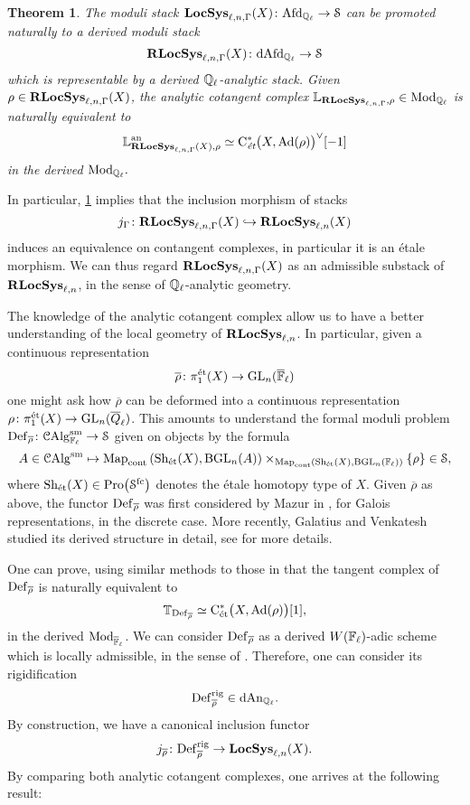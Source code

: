 \documentclass[10pt,a4paper]{amsart}
\numberwithin{equation}{subsection}
\theoremstyle{plain}
\newtheorem{theorem}{Theorem}[section]
\theoremstyle{definition}
\theoremstyle{remark}
\numberwithin{equation}{section}
\begin{document}
\begin{theorem} \label{intro:main}
The moduli stack $\mathbf{LocSys}_{\ell, n, \Gamma}(X) \colon \mathrm{Afd}_{\mathbb{Q}_\ell} \to \mathcal S$ can be promoted naturally to a derived moduli stack 
    \[
        \mathbf R \mathbf{LocSys}_{\ell, n, \Gamma}(X) \colon \mathrm{dAfd}_{\mathbb{Q}_\ell} \to \mathcal S
    \]
which is representable by a derived
$\mathbb{Q}_\ell$-analytic stack. Given $\rho \in \mathbf R \mathbf{LocSys}_{\ell, n, \Gamma}(X)$, the analytic cotangent complex $\mathbb L_{\mathbf R \mathbf{LocSys}_{\ell, n, \Gamma}, \rho} \in \mathrm{Mod}_{\mathbb Q_\ell}$ is naturally equivalent to
    \[
        \mathbb L^{\mathrm{an}}_{\mathbf R \mathbf{LocSys}_{\ell, n, \Gamma} (X), \rho } \simeq \mathrm C^*_{\emph{\text{\'et}}} \big( X, \mathrm{Ad} ( \rho) \big)^\vee[-1]
    \]
in the derived \infcat $\mathrm{Mod}_{\mathbb Q_\ell}.$
\end{theorem}


In particular, \cref{intro:main} implies that the inclusion morphism of stacks
    \[
        j_\Gamma \colon \mathbf R \mathbf{LocSys}_{\ell, n, \Gamma}(X) \hookrightarrow \mathbf R \mathbf{LocSys}_{\ell, n}(X)
    \]
induces an equivalence on contangent complexes, in particular it is an \'etale morphism.
We can thus regard $\mathbf R \mathbf{LocSys}_{\ell, n, \Gamma}(X)$ as an admissible substack of $\mathbf R \mathbf{LocSys}_{\ell, n}$, in the
sense of $\mathbb{Q}_\ell$-analytic geometry.

The knowledge of the analytic cotangent complex allow us to have a better understanding of the local geometry of $\mathbf R \mathbf{LocSys}_{\ell, n}$. In particular, given a continuous representation
    \[
        \overline{\rho} \colon \pi_1^{\text{\'et}}(X) \to \mathrm{GL}_n(\overline{\mathbb F}_\ell)
    \]
one might ask how $\overline{\rho}$ can be deformed into a continuous representation $\rho \colon \pi_1^{\text{\'et}} (X) \to \mathrm{GL}_n(\overline{Q}_\ell)$. This amounts to understand the formal moduli
problem $\mathbf{\mathrm{Def}}_{\overline{\rho}} \colon \mathcal{C}\mathrm{Alg}_{\mathbb F_\ell}^{\mathrm{sm}} \to \mathcal S$ given on objects by the formula
    \[
        A \in \mathcal{C}\mathrm{Alg}^{\mathrm{sm}} \mapsto \mathrm{Map}_{\mathrm{cont}} \left(\mathrm{Sh}_{\text{\'et}}(X), \mathrm{B} \mathrm{GL}_n(A) \right) \times_{ \mathrm{Map}_{\mathrm{cont}} \left(\mathrm{Sh}_{\text{\'et}}(X), \mathrm{B} \mathrm{GL}_n(\mathbb F_\ell) \right)} \{ \rho \}
        \in \mathcal S,
    \]
where $\mathrm{Sh}_{\text{\'et}}(X) \in \mathrm{Pro} \big( \mathcal S^{\mathrm{fc}} \big)$ denotes the \'etale homotopy type of $X$. Given $\overline{\rho}$ as above, the functor $\mathbf{\mathrm{Def}}_{\overline{\rho}}$ was first
considered by Mazur in \cite{mazurDG}, for Galois representations, in the discrete case. More recently, Galatius and Venkatesh studied its derived structure in detail, see
\cite{galatius_dg} for more details.

One can prove, using similar methods to those in \cite{me1} that the tangent complex
of $\mathbf{\mathrm{Def}}_{\overline{\rho}}$ is naturally equivalent to
    \[
        \mathbb T_{\mathbf{\mathrm{Def}}_{\overline{\rho}} } \simeq \mathrm C^*_{\text{\'et}} \big(X, \mathrm{Ad}(\rho) \big)[1],
    \]
in the derived \infcat $\mathrm{Mod}_{\overline{\mathbb F}_\ell}$. We can consider
$\mathbf{\mathrm{Def}}_{\overline{\rho}}$ as a derived $W(\mathbb F_\ell)$-adic scheme which is locally
admissible, in the sense of \cite{me2}. Therefore, one can consider its rigidification
    \[
        \mathbf{\mathrm{Def}}^{\mathrm{rig}}_{\overline{\rho}} \in \mathrm{dAn}_{\mathbb{Q}_\ell}.
    \]
By construction, we have a canonical inclusion functor
    \[
         j_{\overline{\rho}} \colon \mathbf{\mathrm{Def}}^{\mathrm{rig}}_{\overline{\rho}} \to \mathbf{LocSys}_{\ell, n}(X).
    \]  
By comparing both analytic cotangent complexes, one arrives at the following result:
\end{document}

